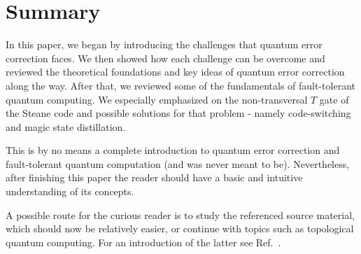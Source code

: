 \section{Summary}\label{sec:conclusion}

In this paper, we began by introducing the challenges that quantum error correction faces.
We then showed how each challenge can be overcome and reviewed the theoretical foundations 
and key ideas of quantum error correction along the way. After that, we reviewed some of the 
fundamentals of {fault-tolerant} quantum computing. We especially emphasized on the {non-transversal} 
$T$ gate of the Steane code and possible solutions for that problem - namely {code-switching} and
magic state distillation.

\smallskip 
\noindent
This is by no means a complete introduction to quantum error correction and {fault-tolerant} quantum computation (and was never meant to be). Nevertheless, after finishing this paper the reader should have a basic and intuitive understanding of its concepts.

\smallskip 
\noindent
A possible route for the curious reader is to study the referenced source material, which should now be relatively easier, or continue with topics such as topological quantum computing. For an introduction of the latter see Ref.~\cite{fujii_quantum_2015}.
